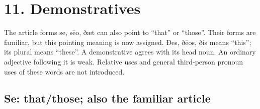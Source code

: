\section*{11. Demonstratives}

The article forms se, sēo, ðæt can also point to “that” or “those”. Their forms are familiar, but this pointing meaning is now assigned. Ðes, ðēos, ðis means “this”; its plural means “these”. A demonstrative agrees with its head noun. An ordinary adjective following it is weak. Relative uses and general third-person pronoun uses of these words are not introduced.

\subsection*{Se: that/\allowbreak{}those; also the familiar article}

